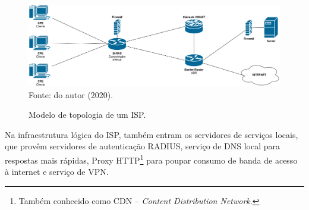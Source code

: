     \begin{figure}[!htb]
        \centering
        \caption{Modelo de topologia de um ISP.} 
        \label{fig:isp} 
        \includegraphics[width=1.0\linewidth]{img/isp.png} \\
        {\small Fonte: do autor (2020).} 
    \end{figure}
    
    Na infraestrutura lógica do ISP, também entram os servidores de serviços locais, que provêm servidores de autenticação RADIUS, serviço de DNS local para respostas mais rápidas, Proxy HTTP\footnote{Também conhecido como CDN -- \textit{Content Distribution Network}.} para poupar consumo de banda de acesso à internet e serviço de VPN.
    